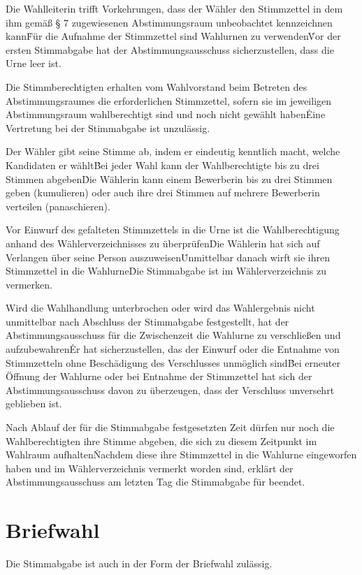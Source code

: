 \begin{multicols}{2}
\Abs \Satz Die Wahlleiterin trifft Vorkehrungen, dass der Wähler den Stimmzettel in dem ihm gemäß § 7 zugewiesenen Abstimmungsraum unbeobachtet kennzeichnen kann\. Für die Aufnahme der Stimmzettel sind Wahlurnen zu verwenden\. Vor der ersten Stimmabgabe hat der Abstimmungsausschuss sicherzustellen, dass die Urne leer ist.

\Abs \Satz Die Stimmberechtigten erhalten vom Wahlvorstand beim Betreten des Abstimmungsraumes die erforderlichen Stimmzettel, sofern sie im jeweiligen Abstimmungsraum wahlberechtigt sind und noch nicht gewählt haben\. Eine Vertretung bei der Stimmabgabe ist unzulässig.

\Abs \Satz Der Wähler gibt seine Stimme ab, indem er eindeutig kenntlich macht, welche Kandidaten er wählt\. Bei jeder Wahl kann der Wahlberechtigte bis zu drei Stimmen abgeben\. Die Wählerin kann einem Bewerberin bis zu drei Stimmen geben (kumulieren) oder auch ihre drei Stimmen auf mehrere Bewerberin verteilen (panaschieren).

\Abs \Satz Vor Einwurf des gefalteten Stimmzettels in die Urne ist die Wahlberechtigung anhand des Wählerverzeichnisses zu überprüfen\. Die Wählerin hat sich auf Verlangen über seine Person auszuweisen\. Unmittelbar danach wirft sie ihren Stimmzettel in die Wahlurne\. Die Stimmabgabe ist im Wählerverzeichnis zu vermerken.

\Abs \Satz Wird die Wahlhandlung unterbrochen oder wird das Wahlergebnis nicht unmittelbar nach Abschluss der Stimmabgabe festgestellt, hat der Abstimmungsausschuss für die Zwischenzeit die Wahlurne zu verschließen und aufzubewahren\. Er hat sicherzustellen, das der Einwurf oder die Entnahme von Stimmzetteln ohne Beschädigung des Verschlusses unmöglich sind\. Bei erneuter Öffnung der Wahlurne oder bei Entnahme der Stimmzettel hat sich der Abstimmungsausschuss davon zu überzeugen, dass der Verschluss unversehrt geblieben ist.

\Abs \Satz Nach Ablauf der für die Stimmabgabe festgesetzten Zeit dürfen nur noch die Wahlberechtigten ihre Stimme abgeben, die sich zu diesem Zeitpunkt im Wahlraum aufhalten\. Nachdem diese ihre Stimmzettel in die Wahlurne eingeworfen haben und im Wählerverzeichnis vermerkt worden sind, erklärt der Abstimmungsausschuss am letzten Tag die Stimmabgabe für beendet.

\section{Briefwahl}
\Abs \Satz Die Stimmabgabe ist auch in der Form der Briefwahl zulässig.


\end{multicols}
